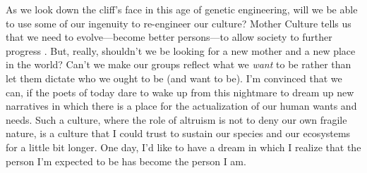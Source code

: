 \documentclass{article}
\begin{document}
As we look down the cliff's face in this age of genetic engineering, will we be
able to use some of our ingenuity to re-engineer our culture? Mother Culture
tells us that we need to evolve---become better persons---to allow society to
further progress \citep{quinn1992}. But, really, shouldn't we be looking for a
new mother and a new place in the world? Can't we make our groups reflect what
we \textit{want} to be rather than let them dictate who we ought to be (and
want to be). I'm convinced that we can, if the poets of today dare to wake up
from this nightmare to dream up new narratives in which there is a place for
the actualization of our human wants and needs. Such a culture, where the role
of altruism is not to deny our own fragile nature, is a culture that I could
trust to sustain our species and our ecosystems for a little bit longer. One
day, I'd like to have a dream in which I realize that the person I'm expected
to be has become the person I am.





\end{document}

